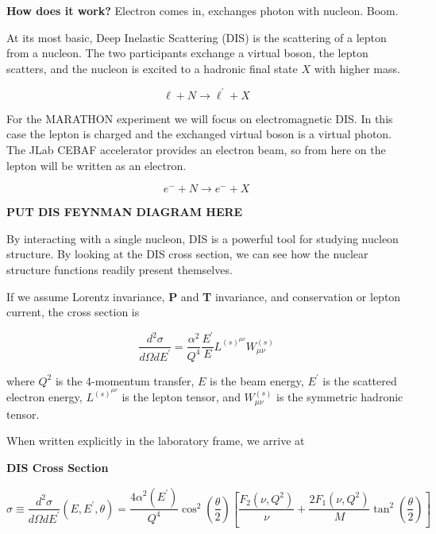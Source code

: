 \textbf{How does it work?}
Electron comes in, exchanges photon with nucleon. Boom.

At its most basic, Deep Inelastic Scattering (DIS) is the scattering of a lepton from a nucleon. The two participants exchange a virtual boson, the lepton scatters, and the nucleon is excited to a hadronic final state $X$ with higher mass.

\begin{equation*}
	\ell + N \rightarrow \ell^\prime + X
\end{equation*}

For the MARATHON experiment we will focus on electromagnetic DIS. In this case the lepton is charged and the exchanged virtual boson is a virtual photon. The JLab CEBAF accelerator provides an electron beam, so from here on the lepton will be written as an electron.

\begin{equation*}
	e^- + N \rightarrow e^- + X
\end{equation*}

\textbf{PUT DIS FEYNMAN DIAGRAM HERE}

By interacting with a single nucleon, DIS is a powerful tool for studying nucleon structure. By looking at the DIS cross section, we can see how the nuclear structure functions readily present themselves.

If we assume Lorentz invariance, \textbf{P} and \textbf{T} invariance, and conservation or lepton current, the cross section is

\begin{equation}
	\frac{d^2\sigma}{d\Omega dE^\prime} = \frac{\alpha^2}{Q^4}\frac{E^\prime}{E} L^{\left(s\right)^{\mu\nu}}W^{\left(s\right)}_{\mu\nu}
\end{equation}

where $Q^2$ is the 4-momentum transfer, $E$ is the beam energy, $E^\prime$ is the scattered electron energy, $L^{\left(s\right)^{\mu\nu}}$ is the lepton tensor, and $W^{\left(s\right)}_{\mu\nu}$ is the symmetric hadronic tensor.

When written explicitly in the laboratory frame, we arrive at

\textbf{DIS Cross Section}

\begin{equation}
	\sigma \equiv \frac{d^2\sigma}{d\Omega dE^\prime}\left(E,E^\prime,\theta\right) = \frac{4\alpha^2\left(E^\prime\right)}{Q^4}\cos^2\left(\frac{\theta}{2}\right)\left[\frac{F_2\left(\nu,Q^2\right)}{\nu}+\frac{2F_1\left(\nu,Q^2\right)}{M}\tan^2\left(\frac{\theta}{2}\right)\right]
\end{equation}